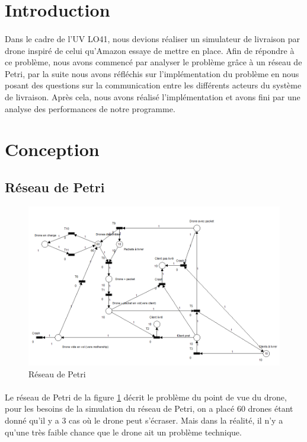 \documentclass[article, backcover, french, nodocumentinfo]{upmethodology-document}
\begin{document}
	\upmdocumentsummary{}
	\upmdocumentauthors{}
	\upmdocumentinformedpeople{}
	\upmpublicationpage{}
	\thispagestyle{empty}
	\tableofcontents{}
	\newpage{}
	\section*{Introduction}
		\paragraph*{}
			Dans le cadre de l'UV LO41, nous devions réaliser un simulateur de livraison par drone inspiré de celui qu’Amazon essaye de mettre en place. Afin de répondre à ce problème, nous avons commencé par analyser le problème grâce à un réseau de Petri, par la suite nous avons réfléchis sur l'implémentation du problème en nous posant des questions sur la communication entre les différents acteurs du système de livraison. Après cela, nous avons réalisé l'implémentation et avons fini par une analyse des performances de notre programme.
	\section{Conception}
		\subsection{Réseau de Petri}
			\begin{figure}[H]
			  \centering
			  \includegraphics[width=\textwidth]{figures/petri_drones}
			  \caption{Réseau de Petri}
			  \label{fig:petrinet}
			\end{figure}
			\paragraph*{}
				Le réseau de Petri de la figure \ref{fig:petrinet} décrit le problème du point de vue du drone, pour les besoins de la simulation du réseau de Petri, on a placé 60 drones étant donné qu'il y a 3 cas où le drone peut s'écraser. Mais dans la réalité, il n'y a qu'une très faible chance que le drone ait un problème technique.
\end{document}
